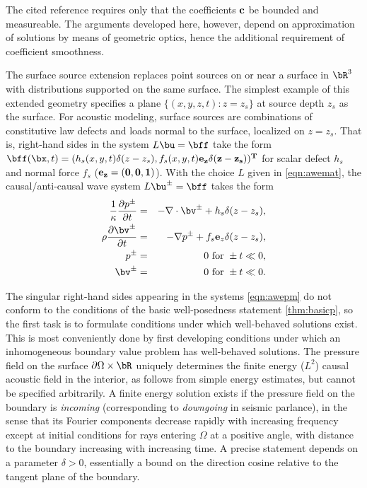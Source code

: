 \begin{remark} The cited reference \cite[]{BlazekStolkSymes:13} requires only that the coefficients ${\bf c}$ be bounded and measureable. The arguments developed here, however, depend on approximation of solutions by means of geometric optics, hence the additional requirement of coefficient smoothness.
\end{remark}
  
The surface source extension replaces point sources on or near a
surface in $\bR^3$ with distributions supported on the same
surface. The simplest example of this extended geometry specifies a
plane $\{(x,y,z,t): z=z_s\}$ at source depth $z_s$ as the surface. For
acoustic modeling, surface sources are combinations of constitutive law
defects and loads normal to the surface, localized on $z=z_s$. That
is, right-hand sides in the system $L\bu=\bff$ take the form
$\bff(\bx,t) = (h_s(x,y,t)\delta(z-z_s),
f_s(x,y,t)\bf{e}_z\delta(z-z_s))^T$ for scalar defect $h_s$ and normal
force $f_s$ ($\bf{e}_z=(0,0,1)$). With the choice $L$ given in
\ref{eqn:awemat}, the causal/anti-causal wave system $L\bu^{\pm}=\bff$
takes the form
\begin{eqnarray}
\label{eqn:awepm}
\frac{1}{\kappa}\frac{\partial p^{\pm}}{\partial t} & = & - \nabla \cdot \bv^{\pm} +
h_s \delta(z-z_s), \nonumber \\
\rho\frac{\partial \bv^{\pm}}{\partial t} & = & - \nabla p^{\pm} +
                                                f_s{\bf e}_z \delta(z-z_s),\nonumber \\
p^{\pm} & =& 0 \mbox{ for } \pm t \ll 0,\nonumber\\ 
\bv^{\pm} & = & 0 \mbox{ for } \pm t \ll 0.
\end{eqnarray}

The singular right-hand sides appearing in the systems \ref{eqn:awepm} do not conform to the conditions of the basic well-posedness statement \ref{thm:basicp}, so the first task is to formulate conditions under which well-behaved solutions exist. This is most conveniently done by first developing conditions under which an inhomogeneous boundary value problem has well-behaved solutions. The pressure field on the surface $\partial \Omega \times \bR$ uniquely determines the finite energy ($L^2$) causal acoustic field in the interior, as follows from simple energy estimates, but cannot be specified arbitrarily. A finite energy solution exists if the pressure field on the boundary is {\em incoming} (corresponding to {\em downgoing} in seismic parlance), in the sense that its Fourier components decrease rapidly with increasing frequency except at initial conditions for rays entering $\Omega$ at a positive angle, with distance to the boundary increasing with increasing time. A precise statement depends on a parameter $\delta >0$, essentially a bound on the direction cosine relative to the tangent plane of the boundary. 

